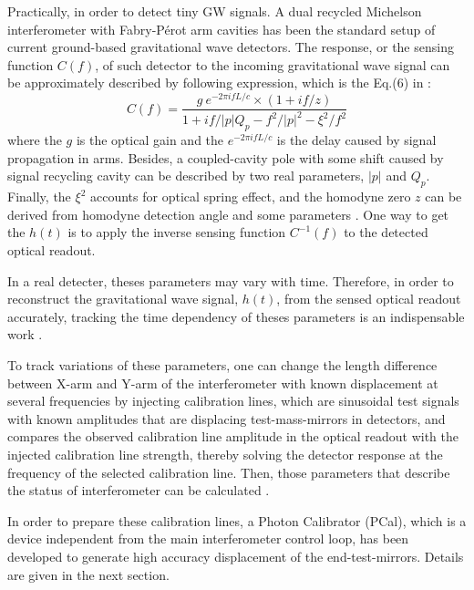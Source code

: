 Practically, in order to detect tiny GW signals. A dual recycled Michelson interferometer with Fabry-P\'erot arm cavities has been the standard setup of current ground-based gravitational wave detectors. The response, or the sensing function $C(f)$, of such detector to the incoming gravitational wave signal can be approximately described by following expression, which is the Eq.(6) in \cite{mif:response}:
\begin{equation}
\label{eq:mifres}
    C(f)=\frac{
    g~ e^{-2 \pi i f L/c} \times (1+ i f/z)
}{
    1+ i f/|p| Q_p - f^2 /|p|^2 - \xi^2/f^2
}
\end{equation}
where the $g$ is the optical gain and the $e^{-2 \pi i f L/c}$ is the delay caused by signal propagation in arms. Besides, a coupled-cavity pole with some shift caused by signal recycling cavity can be described by two real parameters, $|p|$ and $Q_p$. Finally, the $\xi^2$ accounts for optical spring effect, and the homodyne zero $z$ can be derived from homodyne detection angle and some parameters \cite{mif:response}. One way to get the $h(t)$ is to apply the inverse sensing function $C^{-1}(f)$ to the detected optical readout.

In a real detecter, theses parameters may vary with time. Therefore, in order to reconstruct the gravitational wave signal, $h(t)$, from the sensed optical readout accurately, tracking the time dependency of theses parameters is an indispensable work \cite{ligo:reconstruction,ligo:timedep}. 

To track variations of these parameters, one can change the length difference between X-arm and Y-arm of the interferometer with known displacement at several frequencies by injecting calibration lines, which are sinusoidal test signals with known amplitudes that are displacing test-mass-mirrors in detectors, and compares the observed calibration line amplitude in the optical readout with the injected calibration line strength, thereby solving the detector response at the frequency of the selected calibration line. Then, those parameters that describe the status of interferometer can be calculated \cite{ligo:timedep}.

In order to prepare these calibration lines, a Photon Calibrator (PCal), which is a device independent from the main interferometer control loop, has been developed to generate high accuracy displacement of the end-test-mirrors. Details are given in the next section.




